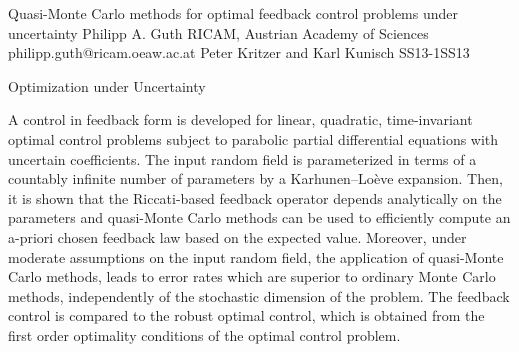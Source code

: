 \begin{talk}
  {Quasi-Monte Carlo methods for optimal feedback control problems under uncertainty}%
  {Philipp A. Guth}%
  {RICAM, Austrian Academy of Sciences}%
  {philipp.guth@ricam.oeaw.ac.at}%
  {Peter Kritzer and Karl Kunisch}%
{}{}{SS13-1}{SS13}

  {Optimization under Uncertainty}%
			
A control in feedback form is developed for linear, quadratic, time-invariant optimal control problems subject to parabolic partial differential equations with uncertain coefficients. The input random field is parameterized in terms of a countably infinite number of parameters by a Karhunen–Lo\`eve expansion. Then, it is shown that the Riccati-based feedback operator depends analytically on the parameters and quasi-Monte Carlo methods can be used to efficiently compute an a-priori chosen feedback law based on the expected value. Moreover, under moderate assumptions on the input random field, the application of quasi-Monte Carlo methods, leads to error rates which are superior to ordinary Monte Carlo methods, independently of the stochastic dimension of the problem. The feedback control is compared to the robust optimal control, which is obtained from the first order optimality conditions of the optimal control problem.


\end{talk}


